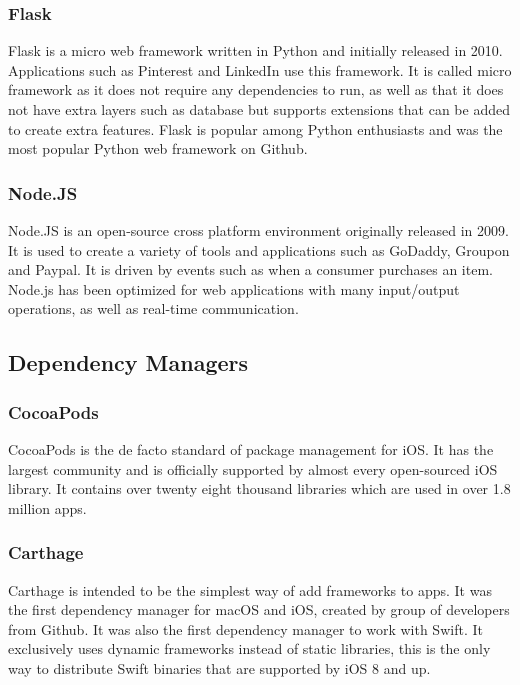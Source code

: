 \subsubsection{Flask}
Flask \cite{flask} is a micro web framework written in Python and initially released in 2010. Applications such as Pinterest and LinkedIn use this framework. It is called micro framework as it does not require any dependencies to run, as well as that it does not have extra layers such as database but supports extensions that can be added to create extra features. Flask is popular among Python enthusiasts and was the most popular Python web framework on Github.

\subsubsection{Node.JS}
Node.JS \cite{node} is an open-source cross platform environment originally released in 2009. It is used to create a variety of tools and applications such as GoDaddy, Groupon and Paypal.  It is driven by events such as when a consumer purchases an item. Node.js has been optimized for web applications with many input/output operations, as well as real-time communication.

\subsection{Dependency Managers}

\subsubsection{CocoaPods}

CocoaPods \cite{pods} is the de facto standard of package management for iOS. It has the largest community and is officially supported by almost every open-sourced iOS library. It contains over twenty eight thousand libraries which are used in over 1.8 million apps.

\subsubsection{Carthage}

Carthage \cite{carthage} is intended to be the simplest way of add frameworks to apps. It was the first dependency manager for macOS and iOS, created by group of developers from Github. It was also the first dependency manager to work with Swift. It exclusively uses dynamic frameworks instead of static libraries, this is the only way to distribute Swift binaries that are supported by iOS 8 and up.

